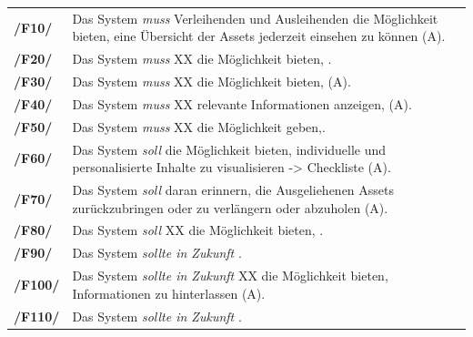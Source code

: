 \begin{center}
        \renewcommand{\arraystretch}{1.5}
        \begin{tabular}{p{}p{}}
                \hline
                \textbf{/F10/}  & Das System \textit{muss} Verleihenden und
                Ausleihenden die Möglichkeit bieten, eine Übersicht der Assets
                jederzeit einsehen zu können (A).                              \\
                \textbf{/F20/}  & Das System \textit{muss} XX die Möglichkeit
                bieten,  .                                                     \\
                \textbf{/F30/}  & Das System \textit{muss} XX die Möglichkeit
                bieten,  (A).                                                  \\
                \textbf{/F40/}  & Das System \textit{muss} XX relevante
                Informationen anzeigen, (A).                                   \\
                \textbf{/F50/}  & Das System \textit{muss} XX die Möglichkeit
                geben,.                                                        \\
                \textbf{/F60/}  & Das System \textit{soll} die Möglichkeit
                bieten, individuelle und personalisierte Inhalte zu
                visualisieren -> Checkliste (A).                               \\
                \textbf{/F70/}  & Das System \textit{soll} daran erinnern, die
                Ausgeliehenen Assets zurückzubringen oder zu verlängern oder
                abzuholen (A).                                                 \\
                \textbf{/F80/}  & Das System \textit{soll} XX die Möglichkeit
                bieten, .                                                      \\
                \textbf{/F90/}  & Das System \textit{sollte in Zukunft} .
                \\
                \textbf{/F100/} & Das System \textit{sollte in Zukunft} XX die
                Möglichkeit bieten, Informationen zu hinterlassen (A).
                \\
                \textbf{/F110/} & Das System \textit{sollte in Zukunft} .
                \\
                \hline
        \end{tabular}
\end{center}


